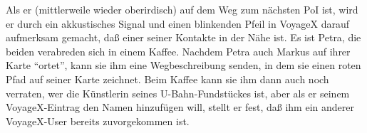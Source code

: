 Als er (mittlerweile wieder oberirdisch) auf dem Weg zum nächsten PoI ist, wird er durch ein akkustisches Signal und einen blinkenden Pfeil in VoyageX darauf aufmerksam gemacht, daß einer seiner Kontakte in der Nähe ist. Es ist Petra, die beiden verabreden sich in einem Kaffee. Nachdem Petra auch Markus auf ihrer Karte "`ortet"', kann sie ihm eine Wegbeschreibung senden, in dem sie einen roten Pfad auf seiner Karte zeichnet. Beim Kaffee kann sie ihm dann auch noch verraten, wer die Künstlerin seines U-Bahn-Fundstückes ist, aber als er seinem VoyageX-Eintrag den Namen hinzufügen will, stellt er fest, daß ihm ein anderer VoyageX-User bereits zuvorgekommen ist.%




\noindent
\noindent


